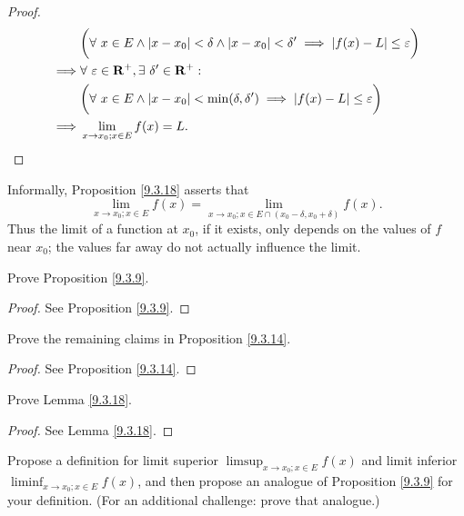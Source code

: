 \begin{proof}
\begin{align*}
                 & \bigg(\forall\ x \in E \land \abs*{x - x_0} < \delta \land \abs*{x - x_0} < \delta' \implies \abs*{f(x) - L} \leq \varepsilon\bigg)            \\
        \implies & \forall\ \varepsilon \in \mathbf{R}^+, \exists\ \delta' \in \mathbf{R}^+ :                                                                     \\
                 & \bigg(\forall\ x \in E \land \abs*{x - x_0} < \min(\delta, \delta') \implies \abs*{f(x) - L} \leq \varepsilon\bigg)                            \\
        \implies & \lim_{x \to x_0 ; x \in E} f(x) = L.
    \end{align*}
\end{proof}

\begin{note}
    Informally, Proposition \ref{9.3.18} asserts that
    \[
        \lim_{x \to x_0 ; x \in E} f(x) = \lim_{x \to x_0 ; x \in E \cap (x_0 - \delta, x_0 + \delta)} f(x).
    \]
    Thus the limit of a function at \(x_0\), if it exists, only depends on the values of \(f\) near \(x_0\);
    the values far away do not actually influence the limit.
\end{note}

\exercisesection

\begin{exercise}\label{ex 9.3.1}
    Prove Proposition \ref{9.3.9}.
\end{exercise}

\begin{proof}
    See Proposition \ref{9.3.9}.
\end{proof}

\begin{exercise}\label{ex 9.3.2}
    Prove the remaining claims in Proposition \ref{9.3.14}.
\end{exercise}

\begin{proof}
    See Proposition \ref{9.3.14}.
\end{proof}

\begin{exercise}\label{ex 9.3.3}
    Prove Lemma \ref{9.3.18}.
\end{exercise}

\begin{proof}
    See Lemma \ref{9.3.18}.
\end{proof}

\begin{exercise}\label{ex 9.3.4}
    Propose a definition for limit superior \(\limsup_{x \to x_0 ; x \in E} f(x)\) and limit inferior \(\liminf_{x \to x_0 ; x \in E} f(x)\), and then propose an analogue of Proposition \ref{9.3.9} for your definition.
    (For an additional challenge: prove that analogue.)
\end{exercise}

